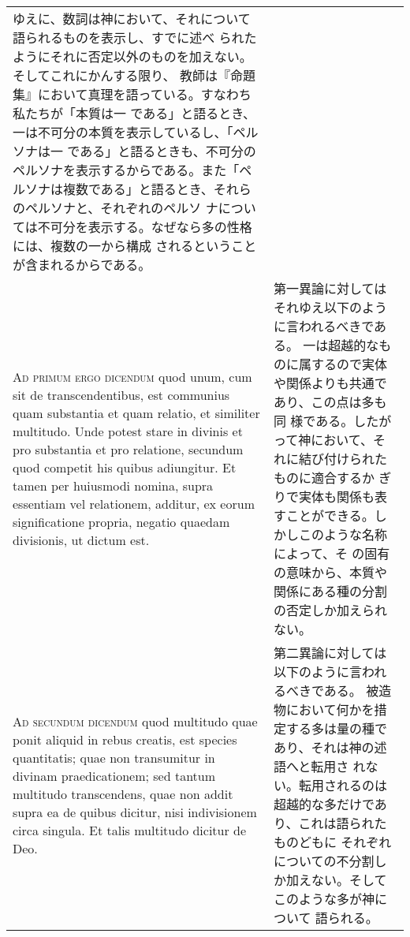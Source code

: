 \documentclass[10pt]{jsarticle} %
\begin{document}
\begin{longtable}{p{21em}p{21em}}
ゆえに、数詞は神において、それについて語られるものを表示し、すでに述べ
 られたようにそれに否定以外のものを加えない。そしてこれにかんする限り、
 教師は『命題集』において真理を語っている。すなわち私たちが「本質は一
 である」と語るとき、一は不可分の本質を表示しているし、「ペルソナは一
 である」と語るときも、不可分のペルソナを表示するからである。また「ペ
 ルソナは複数である」と語るとき、それらのペルソナと、それぞれのペルソ
 ナについては不可分を表示する。なぜなら多の性格には、複数の一から構成
 されるということが含まれるからである。





\\



{\scshape Ad primum ergo dicendum} quod unum, cum sit de transcendentibus, est
communius quam substantia et quam relatio, et similiter
multitudo. Unde potest stare in divinis et pro substantia et pro
relatione, secundum quod competit his quibus adiungitur. Et tamen per
huiusmodi nomina, supra essentiam vel relationem, additur, ex eorum
significatione propria, negatio quaedam divisionis, ut dictum est.

&

第一異論に対してはそれゆえ以下のように言われるべきである。
一は超越的なものに属するので実体や関係よりも共通であり、この点は多も同
 様である。したがって神において、それに結び付けられたものに適合するか
 ぎりで実体も関係も表すことができる。しかしこのような名称によって、そ
 の固有の意味から、本質や関係にある種の分割の否定しか加えられない。


\\



{\scshape Ad secundum dicendum} quod multitudo quae ponit aliquid in rebus
creatis, est species quantitatis; quae non transumitur in divinam
praedicationem; sed tantum multitudo transcendens, quae non addit
supra ea de quibus dicitur, nisi indivisionem circa singula. Et talis
multitudo dicitur de Deo.

&

第二異論に対しては以下のように言われるべきである。
被造物において何かを措定する多は量の種であり、それは神の述語へと転用さ
 れない。転用されるのは超越的な多だけであり、これは語られたものどもに
 それぞれについての不分割しか加えない。そしてこのような多が神について
 語られる。



\\




\end{longtable}
\end{document}
